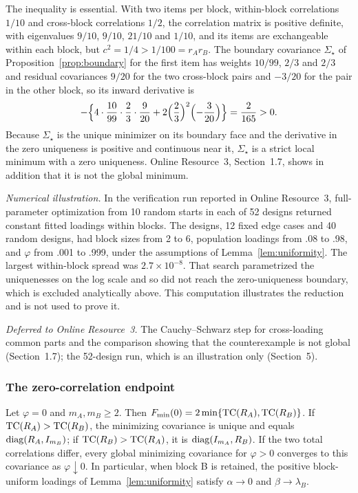 The inequality is essential. With two items per block, within-block correlations $1/10$ and cross-block correlations $1/2$, the correlation matrix is positive definite, with eigenvalues $9/10$, $9/10$, $21/10$ and $1/10$, and its items are exchangeable within each block, but $c^2=1/4>1/100=r_Ar_B$. The boundary covariance $\Sigma_\star$ of Proposition~\ref{prop:boundary} for the first item has weights $10/99$, $2/3$ and $2/3$ and residual covariances $9/20$ for the two cross-block pairs and $-3/20$ for the pair in the other block, so its inward derivative is
\[
-\Bigl\{4\cdot\frac{10}{99}\cdot\frac23\cdot\frac9{20}
+2\Bigl(\frac23\Bigr)^2\Bigl(-\frac3{20}\Bigr)\Bigr\}=\frac2{165}>0.
\]
Because $\Sigma_\star$ is the unique minimizer on its boundary face and the derivative in the zero uniqueness is positive and continuous near it, $\Sigma_\star$ is a strict local minimum with a zero uniqueness. Online Resource~3, Section~1.7, shows in addition that it is not the global minimum.

\textit{Numerical illustration.} In the verification run reported in Online Resource~3, full-parameter optimization from 10 random starts in each of 52 designs returned constant fitted loadings within blocks. The designs, 12 fixed edge cases and 40 random designs, had block sizes from 2 to 6, population loadings from .08 to .98, and $\varphi$ from .001 to .999, under the assumptions of Lemma~\ref{lem:uniformity}. The largest within-block spread was $2.7\times10^{-8}$. That search parametrized the uniquenesses on the log scale and so did not reach the zero-uniqueness boundary, which is excluded analytically above. This computation illustrates the reduction and is not used to prove it.

\textit{Deferred to Online Resource~3.} The Cauchy--Schwarz step for cross-loading common parts and the comparison showing that the counterexample is not global (Section~1.7); the 52-design run, which is an illustration only (Section~5).

\subsubsection*{The zero-correlation endpoint}

\begin{applemma}
\label{lem:D-endpoint}
Let $\varphi=0$ and $m_A,m_B\ge2$. Then $F_{\min}(0)=2\min\{\operatorname{TC}(R_A),\operatorname{TC}(R_B)\}$. If $\operatorname{TC}(R_A)>\operatorname{TC}(R_B)$, the minimizing covariance is unique and equals $\operatorname{diag}(R_A,I_{m_B})$; if $\operatorname{TC}(R_B)>\operatorname{TC}(R_A)$, it is $\operatorname{diag}(I_{m_A},R_B)$. If the two total correlations differ, every global minimizing covariance for $\varphi>0$ converges to this covariance as $\varphi\downarrow0$. In particular, when block B is retained, the positive block-uniform loadings of Lemma~\ref{lem:uniformity} satisfy $\alpha\to0$ and $\beta\to\lambda_B$.
\end{applemma}


